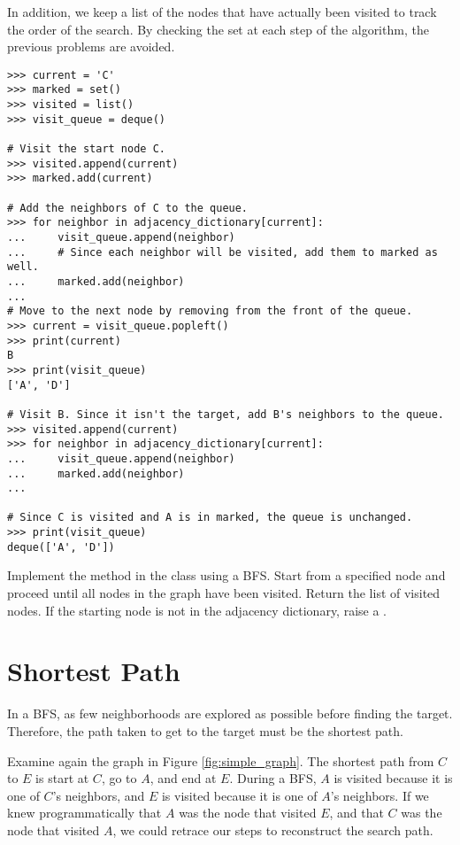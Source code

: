 In addition, we keep a list of the nodes that have actually been visited to track the order of the search.
By checking the set at each step of the algorithm, the previous problems are avoided.

\begin{lstlisting}
>>> current = 'C'
>>> marked = set()
>>> visited = list()
>>> visit_queue = deque()

# Visit the start node C.
>>> visited.append(current)
>>> marked.add(current)

# Add the neighbors of C to the queue.
>>> for neighbor in adjacency_dictionary[current]:
...     visit_queue.append(neighbor)
...     # Since each neighbor will be visited, add them to marked as well.
...     marked.add(neighbor)
...
# Move to the next node by removing from the front of the queue.
>>> current = visit_queue.popleft()
>>> print(current)
B
>>> print(visit_queue)
['A', 'D']

# Visit B. Since it isn't the target, add B's neighbors to the queue.
>>> visited.append(current)
>>> for neighbor in adjacency_dictionary[current]:
...     visit_queue.append(neighbor)
...     marked.add(neighbor)
...

# Since C is visited and A is in marked, the queue is unchanged.
>>> print(visit_queue)
deque(['A', 'D'])
\end{lstlisting}

\begin{problem}
Implement the  method in the  class using a BFS.
Start from a specified node and proceed until all nodes in the graph have been visited.
Return the list of visited nodes.
If the starting node is not in the adjacency dictionary, raise a .
\end{problem}

\section*{Shortest Path} %

In a BFS, as few neighborhoods are explored as possible before finding the target.
Therefore, the path taken to get to the target must be the shortest path.

Examine again the graph in Figure \ref{fig:simple_graph}.
The shortest path from $C$ to $E$ is start at $C$, go to $A$, and end at $E$.
During a BFS, $A$ is visited because it is one of $C$'s neighbors, and $E$ is visited because it is one of $A$'s neighbors.
If we knew programmatically that $A$ was the node that visited $E$, and that $C$ was the node that visited $A$, we could retrace our steps to reconstruct the search path.

